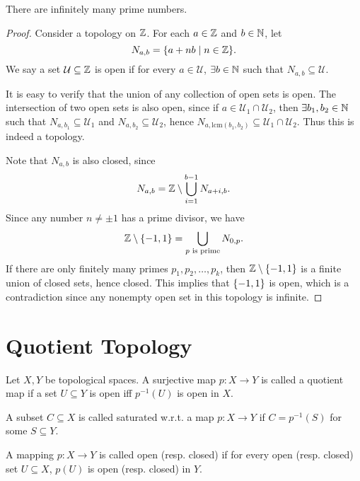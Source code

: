 \begin{thm}
    There are infinitely many prime numbers.
    \begin{proof}
        Consider a topology on ${\mathbb Z }$. For each $a\in {\mathbb Z }$ and $b\in {\mathbb N}$, let
        \[
        N_{a, b} = {\left\{{a + nb \mid n\in {\mathbb Z }}\right\}}.
        \]
        We say a set $\mathcal U\subseteq {\mathbb Z }$ is open if for every $a\in \mathcal U$, $\exists b\in {\mathbb N}$ such that $N_{a, b}\subseteq \mathcal U$. 

        It is easy to verify that the union of any collection of open sets is open. The intersection of two open sets is also open, since if $a\in \mathcal U_1\cap \mathcal U_2$, then $\exists b_1, b_2\in {\mathbb N}$ such that $N_{a, b_1}\subseteq \mathcal U_1$ and $N_{a, b_2}\subseteq \mathcal U_2$, hence $N_{a, \mathrm{lcm}(b_1, b_2)}\subseteq \mathcal U_1\cap \mathcal U_2$. Thus this is indeed a topology.

        Note that $N_{a, b}$ is also closed, since
        \[
        N_{a, b} = {\mathbb Z } \setminus \bigcup_{i=1}^{b-1} N_{a+i, b}.
        \]
        Since any number $n\neq \pm 1$ has a prime divisor, we have
        \[
        {\mathbb Z }\setminus {\left\{{-1, 1}\right\}} = \bigcup_{p\text{ is prime}} N_{0, p}.
        \]
        If there are only finitely many primes $p_1, p_2, \ldots, p_k$, then ${\mathbb Z }\setminus {\left\{{-1, 1}\right\}}$ is a finite union of closed sets, hence closed. This implies that ${\left\{{-1, 1}\right\}}$ is open, which is a contradiction since any nonempty open set in this topology is infinite.
    \end{proof}
\end{thm}

\section{Quotient Topology}

\begin{df}
    Let $X, Y$ be topological spaces. A surjective map $p: X\to Y$ is called a quotient map if a set $U\subseteq Y$ is open iff $p^{-1}(U)$ is open in $X$.
\end{df}

\begin{df}
    A subset $C\subseteq X$ is called saturated w.r.t. a map $p: X\to Y$ if $C = p^{-1}(S)$ for some $S\subseteq Y$.
\end{df}

\begin{df}
    A mapping $p: X\to Y$ is called open (resp. closed) if for every open (resp. closed) set $U\subseteq X$, $p(U)$ is open (resp. closed) in $Y$.
\end{df}

